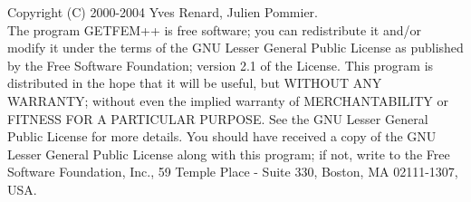 Copyright (C) 2000-2004 Yves Renard, Julien Pommier.\\
The program GETFEM++ is free software; you can redistribute it and/or modify
it under the terms of the GNU Lesser General Public License as published by
the Free Software Foundation; version 2.1 of the License.
This program is distributed in the hope that it will be useful,
but WITHOUT ANY WARRANTY; without even the implied warranty of
MERCHANTABILITY or FITNESS FOR A PARTICULAR PURPOSE.  See the
GNU Lesser General Public License for more details.
You should have received a copy of the GNU  Lesser General Public License
along with this program; if not, write to the Free Software Foundation,
Inc., 59 Temple Place - Suite 330, Boston, MA  02111-1307, USA.
